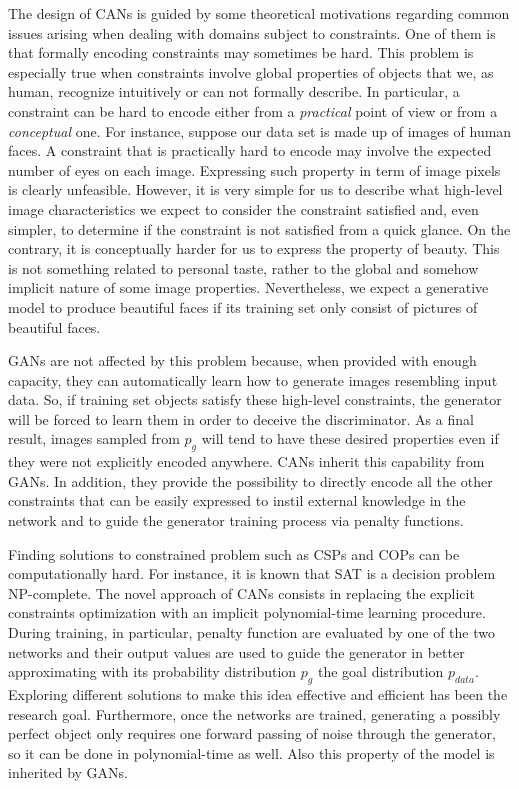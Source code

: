 The design of CANs is guided by some theoretical motivations regarding common issues arising when dealing with domains subject to constraints. One of them is that formally encoding constraints may sometimes be hard. This problem is especially true when constraints involve global properties of objects that we, as human, recognize intuitively or can not formally describe. In particular, a constraint can be hard to encode either from a \textit{practical} point of view or from a \textit{conceptual} one. For instance, suppose our data set is made up of images of human faces. A constraint that is practically hard to encode may involve the expected number of eyes on each image. Expressing such property in term of image pixels is clearly unfeasible. However, it is very simple for us to describe what high-level image characteristics we expect to consider the constraint satisfied and, even simpler, to determine if the constraint is not satisfied from a quick glance. On the contrary, it is conceptually harder for us to express the property of beauty. This is not something related to personal taste, rather to the global and somehow implicit nature of some image properties. Nevertheless, we expect a generative model to produce beautiful faces if its training set only consist of pictures of beautiful faces.

GANs are not affected by this problem because, when provided with enough capacity, they can automatically learn how to generate images resembling input data. So, if training set objects satisfy these high-level constraints, the generator will be forced to learn them in order to deceive the discriminator. As a final result, images sampled from $p_g$ will tend to have these desired properties even if they were not explicitly encoded anywhere. CANs inherit this capability from GANs. In addition, they provide the possibility to directly encode all the other constraints that can be easily expressed to instil external knowledge in the network and to guide the generator training process via penalty functions.

Finding solutions to constrained problem such as CSPs and COPs can be computationally hard. For instance, it is known that SAT is a decision problem NP-complete. The novel approach of CANs consists in replacing the explicit constraints optimization with an implicit polynomial-time learning procedure. During training, in particular, penalty function are evaluated by one of the two networks and their output values are used to guide the generator in better approximating with its probability distribution $p_g$ the goal distribution $p_{data}$. Exploring different solutions to make this idea effective and efficient has been the research goal.  Furthermore, once the networks are trained, generating a possibly perfect object only requires one forward passing of noise through the generator, so it can be done in polynomial-time as well. Also this property of the model is inherited by GANs.

